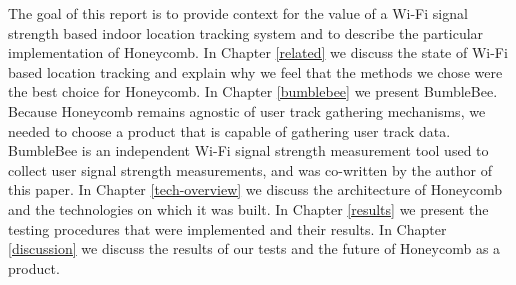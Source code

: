 The goal of this report is to provide context for the value of a Wi-Fi signal strength based indoor location tracking system and to describe the particular implementation of Honeycomb. In Chapter \ref{related} we discuss the state of Wi-Fi based location tracking and explain why we feel that the methods we chose were the best choice for Honeycomb.  In Chapter \ref{bumblebee} we present BumbleBee. Because Honeycomb remains agnostic of user track gathering mechanisms, we needed to choose a product that is capable of gathering user track data. BumbleBee is an independent Wi-Fi signal strength measurement tool used to collect user signal strength measurements, and was co-written by the author of this paper. In Chapter \ref{tech-overview} we discuss the architecture of Honeycomb and the technologies on which it was built. In Chapter \ref{results} we present the testing procedures that were implemented and their results. In Chapter \ref{discussion} we discuss the results of our tests and the future of Honeycomb as a product.
